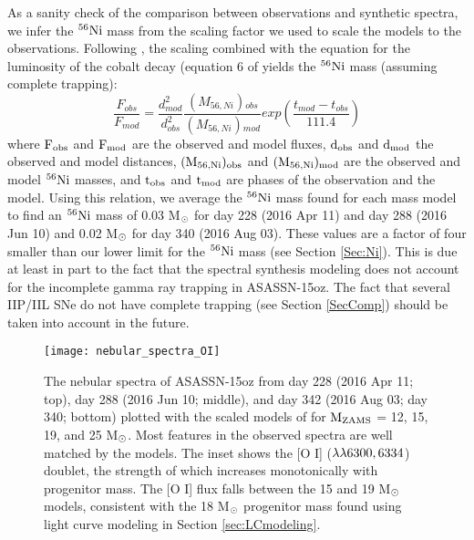 \documentclass[a4paper,fleqn,usenatbib]{mnras}
\newcommand{\msun}{M$\rm{_{\odot}}$ }
\begin{document}
As a sanity check of the comparison between observations and synthetic spectra, we infer the $\rm{{}^{56}Ni}$ mass from the scaling factor we used to scale the models to the observations.
Following \citet{2018jerkstrand}, the scaling combined with the equation for the luminosity of the cobalt decay (equation 6 of \citealt{2012jerkstrand} yields the $\rm{{}^{56}Ni}$ mass (assuming complete trapping): 
\begin{equation}
\frac{F_{obs}}{F_{mod}} = \frac{d_{mod}^{2}}{d_{obs}^{2}}\frac{(M_{56,Ni}){}_{obs}}{(M_{56, Ni}){}_{mod}}exp\left(\frac{t_{mod} - t_{obs}}{111.4}\right)
\end{equation}
where $\rm{F_{obs}}$ and $\rm{F_{mod}}$ are the observed and model fluxes, $\rm{d_{obs}}$ and $\rm{d_{mod}}$ the observed and model distances, $\rm{(M_{56, Ni}){}_{obs}}$ and $\rm{(M_{56, Ni}){}_{mod}}$ are the observed and model $\rm{{}^{56}Ni}$ masses, and $\rm{t_{obs}}$ and $\rm{t_{mod}}$ are phases of the observation and the model.
Using this relation, we average the $\rm{{}^{56}Ni}$ mass found for each mass model to find an $\rm{{}^{56}Ni}$ mass of 0.03 \msun for day 228 (2016 Apr 11) and day 288 (2016 Jun 10) and 0.02 \msun for day 340 (2016 Aug 03).
These values are a factor of four smaller than our lower limit for the $\rm{{}^{56}Ni}$ mass (see Section \ref{Sec:Ni}).
This is due at least in part to the fact that the spectral synthesis modeling does not account for the incomplete gamma ray trapping in ASASSN-15oz.
The fact that several IIP/IIL SNe do not have complete trapping (see Section \ref{SecComp}) should be taken into account in the future.
\begin{figure}
\begin{center}
\texttt{[image: nebular\_spectra\_OI]} %
\caption{The nebular spectra of ASASSN-15oz from day 228 (2016 Apr 11; top), day 288 (2016 Jun 10; middle), and day 342 (2016 Aug 03; day 340; bottom) plotted with the scaled models of \citet{2014jerkstrand} for $\rm{M_{ZAMS}}$ = 12, 15, 19, and 25 M$\rm{_{\odot}}$. 
Most features in the observed spectra are well matched by the models. 
The inset shows the [O I] ($\rm{\lambda\lambda6300, 6334}$) doublet, the strength of which increases monotonically with progenitor mass. 
The [O I] flux falls between the 15 and 19 M$\rm{_{\odot}}$ models, consistent with the 18 M$\rm{_{\odot}}$ progenitor mass found using light curve modeling in Section \ref{sec:LCmodeling}.}
\label{fig:neb}
\end{center}
\end{figure}
\end{document}
